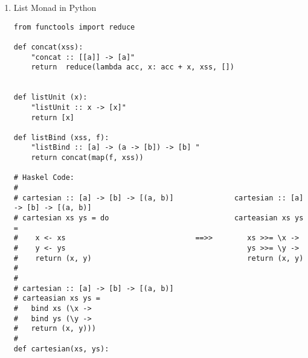 \documentclass[11pt]{article}
\begin{document}
\begin{enumerate}
Example with F\# "workflow" or "computation expression" syntax:

\begin{verbatim}
- List.concat [[1]; []; [2; 3; 4; 5]; [10; 20]] ;;
val it : int list = [1; 2; 3; 4; 5; 10; 20]
> 

(* The F# workflow works like Haskell do-noation  

*)
type ListBuilder () =    
    member this.Bind(xs, f) = List.concat (List.map f xs)

    member this.Return(x) = [x]
;;


type ListBuilder =
  class
    new : unit -> ListBuilder
    member Bind : xs:'b list * f:('b -> 'c list) -> 'c list
    member Return : x:'a -> 'a list
  end

let listDo = ListBuilder () ;;

val listDo : ListBuilder

(*
cartesian :: [a] -> [b] -> [(a, b)]
cartesian xs ys = do
    x <- xs 
    y <- ys 
    return (x, y)
*)

let cartesian xs ys = 
    listDo {
      let! x = xs 
      let! y = ys 
      return (x, y)
   }
;;

val cartesian : xs:'a list -> ys:'b list -> ('a * 'b) list

>  cartesian [1; 2; 3; 4; ] ["a"; "b"; "c"] ;;
val it : (int * string) list =
  [(1, "a"); (1, "b"); (1, "c"); 
   (2, "a"); (2, "b"); (2, "c"); 
   (3, "a"); (3, "b"); (3, "c"); 
   (4, "a"); (4, "b"); (4, "c")]
>
\end{verbatim}

\item List Monad in Python
\label{sec-1-13-2-4}

\begin{verbatim}
from functools import reduce

def concat(xss):
    "concat :: [[a]] -> [a]"
    return  reduce(lambda acc, x: acc + x, xss, [])


def listUnit (x):
    "listUnit :: x -> [x]"
    return [x]

def listBind (xss, f):
    "listBind :: [a] -> (a -> [b]) -> [b] "
    return concat(map(f, xss))

# Haskel Code:
#
# cartesian :: [a] -> [b] -> [(a, b)]              cartesian :: [a] -> [b] -> [(a, b)]   
# cartesian xs ys = do                             carteasian xs ys = 
#    x <- xs                              ==>>        xs >>= \x ->    
#    y <- ys                                          ys >>= \y -> 
#    return (x, y)                                    return (x, y)
#
#
# cartesian :: [a] -> [b] -> [(a, b)] 
# carteasian xs ys = 
#   bind xs (\x -> 
#   bind ys (\y -> 
#   return (x, y)))
#
def cartesian(xs, ys):
    

\end{verbatim}
\end{enumerate}
\end{document}
